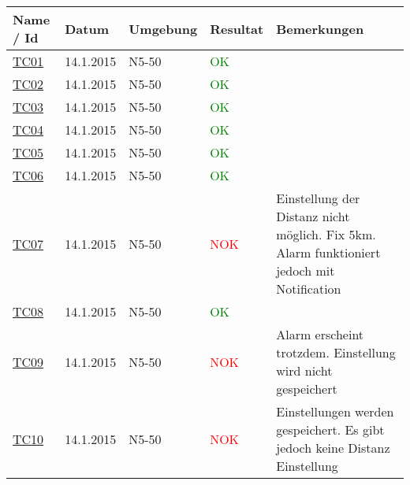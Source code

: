 \begin{center}
	\begin{tabular}{ | l | l | l | l | p{7cm} | }
	\hline
	Name / Id & Datum & Umgebung & Resultat & Bemerkungen \\
	\hline
	\hyperlink{TC01}{TC01} & 14.1.2015 & N5-50 & \textcolor{green}{OK} &  \\
	\hline
	\hyperlink{TC02}{TC02} & 14.1.2015 & N5-50 & \textcolor{green}{OK} & \\
	\hline
	\hyperlink{TC03}{TC03} & 14.1.2015 & N5-50 & \textcolor{green}{OK} & \\
	\hline
	\hyperlink{TC04}{TC04} & 14.1.2015 & N5-50 & \textcolor{green}{OK} & \\
	\hline
	\hyperlink{TC05}{TC05} & 14.1.2015 & N5-50 & \textcolor{green}{OK} & \\
	\hline
	\hyperlink{TC06}{TC06} & 14.1.2015 & N5-50 & \textcolor{green}{OK} & \\
	\hline
	\hyperlink{TC07}{TC07} & 14.1.2015 & N5-50 & \textcolor{red}{NOK} & Einstellung der Distanz nicht möglich. Fix 5km. Alarm funktioniert jedoch mit Notification \\
	\hline
	\hyperlink{TC08}{TC08} & 14.1.2015 & N5-50 & \textcolor{green}{OK} & \\
	\hline
	\hyperlink{TC09}{TC09} & 14.1.2015 & N5-50 & \textcolor{red}{NOK} & Alarm erscheint trotzdem. Einstellung wird nicht gespeichert\\
	\hline
	\hyperlink{TC10}{TC10} & 14.1.2015 & N5-50 & \textcolor{red}{NOK} & Einstellungen werden gespeichert. Es gibt jedoch keine Distanz Einstellung\\
	\hline
	\end{tabular}
\end{center}



